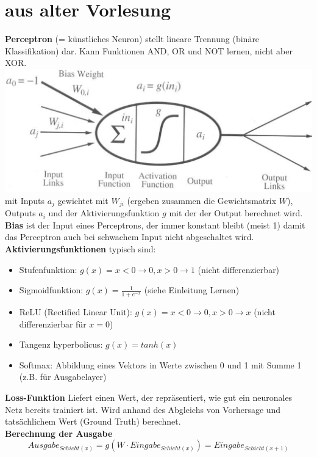 \documentclass[12pt]{article}
\begin{document}
	\section{aus alter Vorlesung}
	\textbf{Perceptron} (= künstliches Neuron) stellt lineare Trennung (binäre Klassifikation) dar. Kann Funktionen AND, OR und NOT lernen, nicht aber XOR.\\
	\includegraphics[width=\linewidth]{figures/perceptron.png}\\
	mit Inputs $a_j$ gewichtet mit $W_{ji}$ (ergeben zusammen die Gewichtsmatrix $W$), Outputs $a_i$ und der Aktivierungsfunktion $g$ mit der der Output berechnet wird.\\
	\textbf{Bias} ist der Input eines Perceptrons, der immer konstant bleibt (meist 1) damit das Perceptron auch bei schwachem Input nicht abgeschaltet wird.\\
	\textbf{Aktivierungsfunktionen} typisch sind:
	\begin{itemize}
		\item Stufenfunktion: $g(x) = x < 0 \rightarrow 0, x > 0 \rightarrow 1$ (nicht differenzierbar)
		\item Sigmoidfunktion: $g(x) = \frac{1}{1 + e^{-x}}$ (siehe Einleitung Lernen)
		\item ReLU (Rectified Linear Unit): $g(x) = x < 0 \rightarrow 0, x > 0 \rightarrow x$ (nicht differenzierbar für $x=0$)
		\item Tangenz hyperbolicus: $g(x) = tanh(x)$
		\item Softmax: Abbildung eines Vektors in Werte zwischen 0 und 1 mit Summe 1 (z.B. für Ausgabelayer)
	\end{itemize}
	\textbf{Loss-Funktion} Liefert einen Wert, der repräsentiert, wie gut ein neuronales Netz bereits trainiert ist. Wird anhand des Abgleichs von Vorhersage und tatsächlichem Wert (Ground Truth) berechnet.\\
	\textbf{Berechnung der Ausgabe}
	$$Ausgabe_{Schicht(x)} = g(W \cdot Eingabe_{Schicht(x)}) = Eingabe_{Schicht(x+1)}$$
\end{document}
